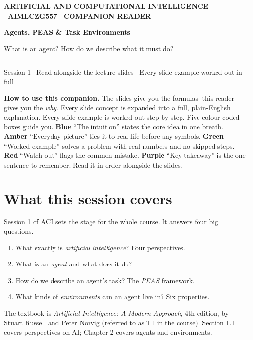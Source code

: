 \documentclass[a4paper,11pt]{article}
\providecommand{\addfontfeatureslike}[1]{#1}
\newcommand{\titlebanner}[4]{%
  \begin{tcolorbox}[
    enhanced, breakable=false,
    colback=navy, colframe=navy,
    boxrule=0pt, arc=3pt, outer arc=3pt,
    left=16pt, right=16pt, top=16pt, bottom=16pt,
    before skip=2pt, after skip=14pt,
    width=\linewidth ]
    {\sffamily\footnotesize\bfseries\color{white!85}%
      \MakeUppercase{\addfontfeatureslike{#1}}}\par
    \vspace{6pt}
    {\sffamily\bfseries\fontsize{30}{34}\selectfont\color{white} #2\par}
    \vspace{5pt}
    {\sffamily\large\color{white!88} #3\par}
    \vspace{9pt}
    {\color{white!55}\rule{\linewidth}{0.4pt}}\par
    \vspace{6pt}
    {\sffamily\footnotesize\color{white!82} #4\par}
  \end{tcolorbox}%
}
\begin{document}

\thispagestyle{fancy}

\titlebanner
  {Artificial and Computational Intelligence \textperiodcentered\ AIMLCZG557 \textperiodcentered\ Companion Reader}
  {Agents, PEAS \& Task Environments}
  {What is an agent? How do we describe what it must do?}
  {Session 1 \textperiodcentered\ Read alongside the lecture slides \textperiodcentered\ Every slide example worked out in full}

\noindent\textbf{How to use this companion.}
The slides give you the formulas; this reader gives you the \emph{why}.
Every slide concept is expanded into a full, plain-English explanation.
Every slide example is worked out step by step.
Five colour-coded boxes guide you.
\textcolor{intuFrame}{\textbf{Blue}} ``The intuition'' states the core idea in one breath.
\textcolor{everyFrame}{\textbf{Amber}} ``Everyday picture'' ties it to real life before any symbols.
\textcolor{workFrame}{\textbf{Green}} ``Worked example'' solves a problem with real numbers and no skipped steps.
\textcolor{watchFrame}{\textbf{Red}} ``Watch out'' flags the common mistake.
\textcolor{keyFrame}{\textbf{Purple}} ``Key takeaway'' is the one sentence to remember.
Read it in order alongside the slides.

\medskip

\section{What this session covers}

Session 1 of ACI sets the stage for the whole course.
It answers four big questions.

\begin{enumerate}
  \item What exactly is \emph{artificial intelligence}? Four perspectives.
  \item What is an \emph{agent} and what does it do?
  \item How do we describe an agent's task? The \emph{PEAS} framework.
  \item What kinds of \emph{environments} can an agent live in? Six properties.
\end{enumerate}

The textbook is \emph{Artificial Intelligence: A Modern Approach}, 4th edition,
by Stuart Russell and Peter Norvig (referred to as T1 in the course).
Section 1.1 covers perspectives on AI; Chapter 2 covers agents and environments.
\end{document}
